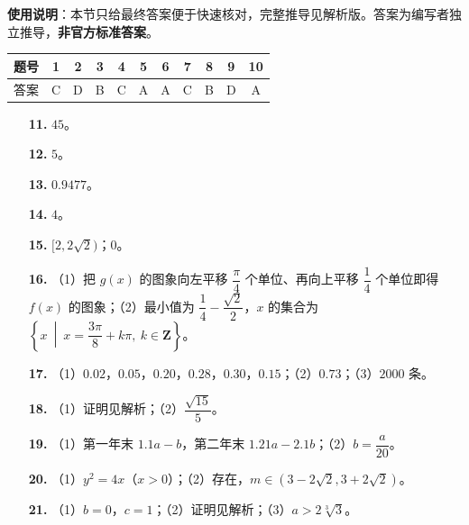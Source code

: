 
\begin{gknotice}
\textbf{使用说明}：本节只给最终答案便于快速核对，完整推导见解析版。答案为编写者独立推导，\textbf{非官方标准答案}。
\end{gknotice}

\begin{center}\begin{tabular}{ccccccccccc}
\toprule
题号 & 1 & 2 & 3 & 4 & 5 & 6 & 7 & 8 & 9 & 10 \\
\midrule
答案 & C & D & B & C & A & A & C & B & D & A \\
\bottomrule
\end{tabular}\end{center}

\begin{itemize}[leftmargin=2.6em]
  \item[\textbf{11.}] $45$。
  \item[\textbf{12.}] $5$。
  \item[\textbf{13.}] $0.9477$。
  \item[\textbf{14.}] $4$。
  \item[\textbf{15.}] $[2,2\sqrt2)$；$0$。
\end{itemize}

\begin{itemize}[leftmargin=2.6em]
  \item[\textbf{16.}] （1）把 $g(x)$ 的图象向左平移 $\dfrac{\pi}{4}$ 个单位、再向上平移 $\dfrac14$ 个单位即得 $f(x)$ 的图象；（2）最小值为 $\dfrac14-\dfrac{\sqrt2}{2}$，$x$ 的集合为 $\left\{x\ \middle|\ x=\dfrac{3\pi}{8}+k\pi,\ k\in\mathbf Z\right\}$。
  \item[\textbf{17.}] （1）$0.02$，$0.05$，$0.20$，$0.28$，$0.30$，$0.15$；（2）$0.73$；（3）$2000$ 条。
  \item[\textbf{18.}] （1）证明见解析；（2）$\dfrac{\sqrt{15}}{5}$。
  \item[\textbf{19.}] （1）第一年末 $1.1a-b$，第二年末 $1.21a-2.1b$；（2）$b=\dfrac a{20}$。
  \item[\textbf{20.}] （1）$y^2=4x$（$x>0$）；（2）存在，$m\in(3-2\sqrt2,3+2\sqrt2)$。
  \item[\textbf{21.}] （1）$b=0$，$c=1$；（2）证明见解析；（3）$a>2\sqrt[3]{3}$。
\end{itemize}
